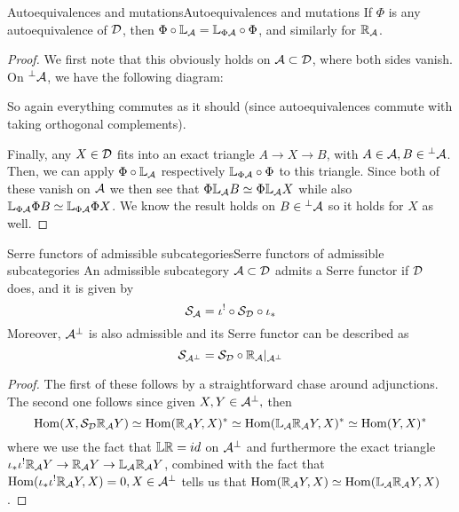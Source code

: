 \begin{corollary}{Autoequivalences and mutations}{Autoequivalences and mutations}
    If $\Phi$ is any autoequivalence of $\mathcal{D}$, then $\Phi \circ \mathbb{L}_{\mathcal{A}} = \mathbb{L}_{\Phi\mathcal{A}} \circ \Phi$, and similarly for $\mathbb{R}_{\mathcal{A}}$.
\end{corollary}
\begin{proof}
    We first note that this obviously holds on $\mathcal{A} \subset \mathcal{D}$, where both sides vanish. On $\prescript{\perp}{}{}\mathcal{A}$, we have the following diagram: 
    \begin{center}
    \end{center}

    So again everything commutes as it should (since autoequivalences commute with taking orthogonal complements).
    
    Finally, any $X\in \mathcal{D}$ fits into an exact triangle $A\rightarrow X \rightarrow B$, with $A\in\mathcal{A}, B\in \prescript{\perp}{}{}\mathcal{A}$. Then, we can apply $\Phi \circ \mathbb{L}_{\mathcal{A}} $ respectively $\mathbb{L}_{\Phi\mathcal{A}} \circ \Phi$ to this triangle. Since both of these vanish on $\mathcal{A}$ we then see that $\Phi\mathbb{L}_{\mathcal{A}} B \simeq \Phi \mathbb{L}_{\mathcal{A}} X $ while also $\mathbb{L}_{\Phi\mathcal{A}} \Phi B \simeq \mathbb{L}_{\Phi\mathcal{A}} \Phi X$. We know the result holds on $B\in \prescript{\perp}{}{}\mathcal{A}$ so it holds for $X$ as well.

\end{proof}

\begin{lemma}{Serre functors of admissible subcategories}{Serre functors of admissible subcategories}
    An admissible subcategory $\mathcal{A}\subset \mathcal{D}$ admits a Serre functor if $\mathcal{D}$ does, and it is given by $$\mathcal{S}_{\mathcal{A}} = \iota^! \circ \mathcal{S}_{\mathcal{D}} \circ \iota_*$$
    Moreover, $\mathcal{A}^\perp$ is also admissible and its Serre functor can be described as $$\mathcal{S}_{\mathcal{A}^\perp}=\mathcal{S}_{\mathcal{D}} \circ \mathbb{R}_{\mathcal{A}}|_{\mathcal{A}^\perp}$$  
  \end{lemma}
  \begin{proof}
    The first of these follows by a straightforward chase around adjunctions. The second one follows since given $X,Y \in \mathcal{A}^\perp,$ then $$\operatorname{Hom}(X, \mathcal{S}_{\mathcal{D}} \mathbb{R}_{\mathcal{A}} Y)\simeq \operatorname{Hom}(\mathbb{R}_{\mathcal{A}} Y, X)^*\simeq \operatorname{Hom}(\mathbb{L}_{\mathcal{A}} \mathbb{R}_{\mathcal{A}} Y, X)^*\simeq \operatorname{Hom}(Y,X)^*$$where we use the fact that $\mathbb{L} \mathbb{R} =id$ on $\mathcal{A}^\perp$ and furthermore the exact triangle $\iota_* \iota^! \mathbb{R}_{\mathcal{A}} Y \rightarrow \mathbb{R}_{\mathcal{A}} Y \rightarrow \mathbb{L}_{\mathcal{A}} \mathbb{R}_{\mathcal{A}} Y$, combined with the fact that $\operatorname{Hom}(\iota_* \iota^! \mathbb{R}_{\mathcal{A}} Y,X)=0, X\in \mathcal{A}^\perp$ tells us that $\operatorname{Hom}(\mathbb{R}_{\mathcal{A}} Y, X)\simeq \operatorname{Hom}(\mathbb{L}_{\mathcal{A}} \mathbb{R}_{\mathcal{A}} Y, X)$.
 \end{proof}


